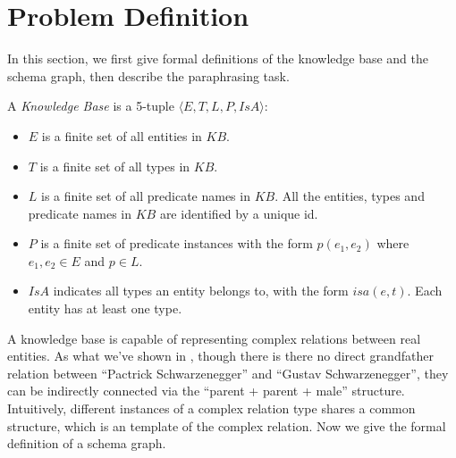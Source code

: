 \section{Problem Definition}
\label{sec:problem}

In this section, we first give formal definitions of the knowledge base
and the schema graph, then describe the paraphrasing task.

\begin{definition}
A {\em Knowledge Base} is a 5-tuple $\langle E, T, L, P, IsA \rangle$:
\begin{itemize}
  \item $E$ is a finite set of all entities in $KB$.
  \item $T$ is a finite set of all types in $KB$.
  \item $L$ is a finite set of all predicate names in $KB$.
  All the entities, types and predicate names in $KB$ are identified by a unique id.
  \item $P$ is a finite set of predicate instances with the form
  $p(e_1, e_2)$ where $e_1, e_2 \in E$ and $p \in L$.
  \item $IsA$ indicates all types an entity belongs to, with the form $isa(e, t)$.
  Each entity has at least one type.
\end{itemize}
\end{definition}


A knowledge base is capable of representing complex relations
between real entities.
As what we've shown in , though there is there no
direct grandfather relation between ``Pactrick Schwarzenegger''
and ``Gustav Schwarzenegger'', they can be indirectly connected via
the ``parent + parent + male'' structure.
Intuitively, different instances of a complex relation type shares a
common structure, which is an template of the complex relation.
Now we give the formal definition of a schema graph.

